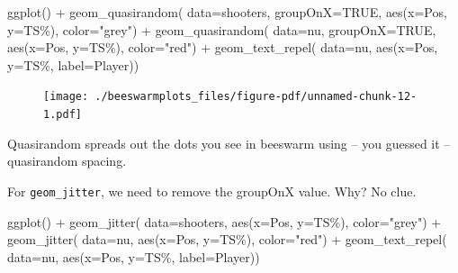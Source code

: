 \documentclass[
  letterpaper,
  DIV=11,
  numbers=noendperiod]{scrreprt}
\newenvironment{Shaded}{\begin{snugshade}}{\end{snugshade}}
\newcommand{\AttributeTok}[1]{\textcolor[rgb]{0.40,0.45,0.13}{#1}}
\newcommand{\ConstantTok}[1]{\textcolor[rgb]{0.56,0.35,0.01}{#1}}
\newcommand{\FunctionTok}[1]{\textcolor[rgb]{0.28,0.35,0.67}{#1}}
\newcommand{\NormalTok}[1]{\textcolor[rgb]{0.00,0.23,0.31}{#1}}
\newcommand{\SpecialCharTok}[1]{\textcolor[rgb]{0.37,0.37,0.37}{#1}}
\newcommand{\StringTok}[1]{\textcolor[rgb]{0.13,0.47,0.30}{#1}}
\begin{document}
\begin{Shaded}
\begin{Highlighting}[]
\FunctionTok{ggplot}\NormalTok{() }\SpecialCharTok{+} 
  \FunctionTok{geom\_quasirandom}\NormalTok{(}
    \AttributeTok{data=}\NormalTok{shooters, }
    \AttributeTok{groupOnX=}\ConstantTok{TRUE}\NormalTok{, }
    \FunctionTok{aes}\NormalTok{(}\AttributeTok{x=}\NormalTok{Pos, }\AttributeTok{y=}\StringTok{\textasciigrave{}}\AttributeTok{TS\%}\StringTok{\textasciigrave{}}\NormalTok{), }\AttributeTok{color=}\StringTok{"grey"}\NormalTok{) }\SpecialCharTok{+} 
  \FunctionTok{geom\_quasirandom}\NormalTok{(}
    \AttributeTok{data=}\NormalTok{nu, }
    \AttributeTok{groupOnX=}\ConstantTok{TRUE}\NormalTok{, }
    \FunctionTok{aes}\NormalTok{(}\AttributeTok{x=}\NormalTok{Pos, }\AttributeTok{y=}\StringTok{\textasciigrave{}}\AttributeTok{TS\%}\StringTok{\textasciigrave{}}\NormalTok{), }\AttributeTok{color=}\StringTok{"red"}\NormalTok{) }\SpecialCharTok{+} 
  \FunctionTok{geom\_text\_repel}\NormalTok{(}
    \AttributeTok{data=}\NormalTok{nu, }
    \FunctionTok{aes}\NormalTok{(}\AttributeTok{x=}\NormalTok{Pos, }\AttributeTok{y=}\StringTok{\textasciigrave{}}\AttributeTok{TS\%}\StringTok{\textasciigrave{}}\NormalTok{, }\AttributeTok{label=}\NormalTok{Player))}
\end{Highlighting}
\end{Shaded}

\begin{figure}[H]

{\centering \texttt{[image: ./beeswarmplots\_files/figure-pdf/unnamed-chunk-12-1.pdf]}

}

\end{figure}

Quasirandom spreads out the dots you see in beeswarm using -- you
guessed it -- quasirandom spacing.

For \texttt{geom\_jitter}, we need to remove the groupOnX value. Why? No
clue.

\begin{Shaded}
\begin{Highlighting}[]
\FunctionTok{ggplot}\NormalTok{() }\SpecialCharTok{+} 
  \FunctionTok{geom\_jitter}\NormalTok{(}
    \AttributeTok{data=}\NormalTok{shooters, }
    \FunctionTok{aes}\NormalTok{(}\AttributeTok{x=}\NormalTok{Pos, }\AttributeTok{y=}\StringTok{\textasciigrave{}}\AttributeTok{TS\%}\StringTok{\textasciigrave{}}\NormalTok{), }\AttributeTok{color=}\StringTok{"grey"}\NormalTok{) }\SpecialCharTok{+} 
  \FunctionTok{geom\_jitter}\NormalTok{(}
    \AttributeTok{data=}\NormalTok{nu, }
    \FunctionTok{aes}\NormalTok{(}\AttributeTok{x=}\NormalTok{Pos, }\AttributeTok{y=}\StringTok{\textasciigrave{}}\AttributeTok{TS\%}\StringTok{\textasciigrave{}}\NormalTok{), }\AttributeTok{color=}\StringTok{"red"}\NormalTok{) }\SpecialCharTok{+} 
  \FunctionTok{geom\_text\_repel}\NormalTok{(}
    \AttributeTok{data=}\NormalTok{nu, }
    \FunctionTok{aes}\NormalTok{(}\AttributeTok{x=}\NormalTok{Pos, }\AttributeTok{y=}\StringTok{\textasciigrave{}}\AttributeTok{TS\%}\StringTok{\textasciigrave{}}\NormalTok{, }\AttributeTok{label=}\NormalTok{Player))}
\end{Highlighting}
\end{Shaded}
\end{document}
